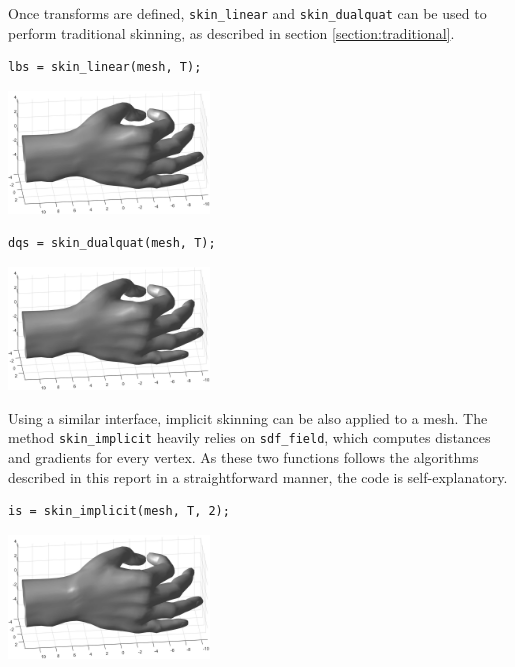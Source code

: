 \documentclass[a4paper,10pt]{article}
\begin{document}
\begin{multicols}{2}
Once transforms are defined, \lstinline!skin_linear! and \lstinline!skin_dualquat! can be used to perform traditional skinning, as described in section \ref{section:traditional}.

\begin{lstlisting}
lbs = skin_linear(mesh, T);
\end{lstlisting}

\begin{center}
\includegraphics[width=0.4\textwidth]{figs/demo_linear}
\end{center}

\begin{lstlisting}
dqs = skin_dualquat(mesh, T);
\end{lstlisting}

\begin{center}
\includegraphics[width=0.4\textwidth]{figs/demo_dualquat}
\end{center}

Using a similar interface, implicit skinning can be also applied to a mesh.
The method \lstinline!skin_implicit! heavily relies on \lstinline!sdf_field!, which computes distances and gradients for every vertex.
As these two functions follows the algorithms described in this report in a straightforward manner, the code is self-explanatory.

\begin{lstlisting}
is = skin_implicit(mesh, T, 2);
\end{lstlisting}

\begin{center}
\includegraphics[width=0.4\textwidth]{figs/demo_implicit}
\end{center}



\end{multicols}
\end{document}
